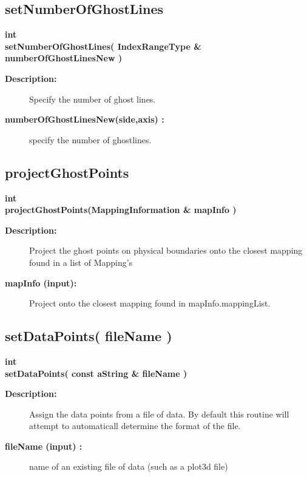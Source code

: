 \subsection{setNumberOfGhostLines}
 
\begin{flushleft} \textbf{%
int  \\ 
\settowidth{\DataPointMappingIncludeArgIndent}{setNumberOfGhostLines(}%
setNumberOfGhostLines( IndexRangeType \& numberOfGhostLinesNew )
}\end{flushleft}
\begin{description}
\item[{\bf Description:}] 
    Specify the number of ghost lines.
\item[{\bf numberOfGhostLinesNew(side,axis) :}]  specify the number of ghostlines.
\end{description}
\subsection{projectGhostPoints}
 
\begin{flushleft} \textbf{%
int  \\ 
\settowidth{\DataPointMappingIncludeArgIndent}{projectGhostPoints(}%
projectGhostPoints(MappingInformation \& mapInfo )
}\end{flushleft}
\begin{description}
\item[{\bf Description:}] 
   Project the ghost points on physical boundaries onto the closest mapping
  found in a list of Mapping's

\item[{\bf mapInfo (input):}]   Project onto the closest mapping found in mapInfo.mappingList.

\end{description}
\subsection{setDataPoints( fileName )}
 
\begin{flushleft} \textbf{%
int  \\ 
\settowidth{\DataPointMappingIncludeArgIndent}{setDataPoints(}%
setDataPoints( const aString \& fileName )
}\end{flushleft}
\begin{description}
\item[{\bf Description:}] 
   Assign the  data points from a file of data. By default this routine will
    attempt to automaticall determine the format of the file.
\item[{\bf fileName (input) :}]  name of an existing file of data (such as a plot3d file)
 
\end{description}
